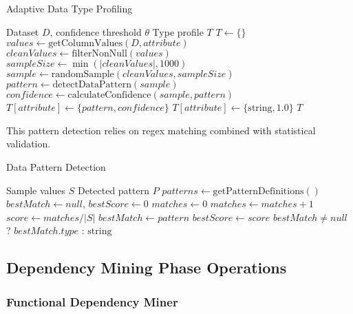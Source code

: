 \documentclass[sigconf]{acmart}
\begin{document}
\begin{algorithm}
\caption{Adaptive Data Type Profiling}
\label{alg:type-profiler}
\begin{algorithmic}[1]
\REQUIRE Dataset $D$, confidence threshold $\theta$
\ENSURE Type profile $T$
\STATE $T \leftarrow \{\}$
    \STATE $values \leftarrow 
    \text{getColumnValues}(D, attribute)$
    \STATE $cleanValues \leftarrow \text{filterNonNull}(values)$
    \STATE $sampleSize \leftarrow \min(|cleanValues|, 1000)$
    \STATE $sample \leftarrow 
    \text{randomSample}(cleanValues, sampleSize)$
    \STATE $pattern \leftarrow \text{detectDataPattern}(sample)$
    \STATE $confidence \leftarrow 
    \text{calculateConfidence}(sample, pattern)$
        \STATE $T[attribute] \leftarrow \{pattern, confidence\}$
    \ELSE
        \STATE $T[attribute] \leftarrow \{\text{string}, 1.0\}$
    \ENDIF
\ENDFOR
\STATE \RETURN $T$
\end{algorithmic}
\end{algorithm}

This pattern detection relies on regex matching combined with statistical validation.

\begin{algorithm}
\caption{Data Pattern Detection}
\label{alg:pattern-detect}
\begin{algorithmic}[1]
\REQUIRE Sample values $S$
\ENSURE Detected pattern $P$
\STATE $patterns \leftarrow \text{getPatternDefinitions}()$
\STATE $bestMatch \leftarrow null$, $bestScore \leftarrow 0$
    \STATE $matches \leftarrow 0$
            \STATE $matches \leftarrow matches + 1$
        \ENDIF
    \ENDFOR
    \STATE $score \leftarrow matches / |S|$
        \STATE $bestMatch \leftarrow pattern$
        \STATE $bestScore \leftarrow score$
    \ENDIF
\ENDFOR
\STATE \RETURN $bestMatch \neq null$ ? 
$bestMatch.type$ : $\text{string}$
\end{algorithmic}
\end{algorithm}

\subsection{Dependency Mining Phase Operations}

\subsubsection{Functional Dependency Miner}
\end{document}
